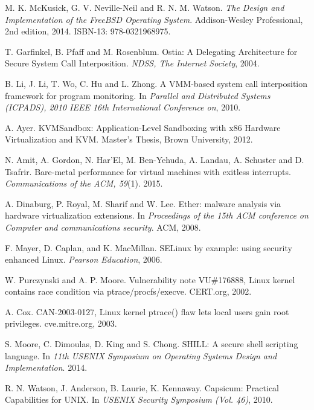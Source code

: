 \documentclass{article}
\begin{document}
\begin{thebibliography}{99}

M. K. McKusick, G. V. Neville-Neil and R. N. M. Watson.
\emph{The Design and Implementation of the FreeBSD Operating System}.
Addison-Wesley Professional,
2nd edition,
2014.
ISBN-13: 978-0321968975.

T. Garfinkel, B. Pfaff and M. Rosenblum.
Ostia: A Delegating Architecture for Secure System Call Interposition.
\emph{NDSS, The Internet Society}, 2004.

B. Li, J. Li, T. Wo, C. Hu and L. Zhong.
A VMM-based system call interposition framework for program monitoring.
In \emph{Parallel and Distributed Systems (ICPADS), 2010 IEEE 16th International Conference on}, 2010.

A. Ayer.
KVMSandbox: Application-Level Sandboxing with x86 Hardware Virtualization and KVM.
Master's Thesis, Brown University, 2012.

N. Amit, A. Gordon, N. Har'El, M. Ben-Yehuda, A. Landau, A. Schuster and D. Tsafrir.
Bare-metal performance for virtual machines with exitless interrupts.
\emph{Communications of the ACM, 59}(1). 2015.

A. Dinaburg, P. Royal, M. Sharif and W. Lee.
Ether: malware analysis via hardware virtualization extensions.
In \emph{Proceedings of the 15th ACM conference on Computer and communications security}.
ACM, 2008.

F. Mayer, D. Caplan, and K. MacMillan.
SELinux by example: using security enhanced Linux.
\emph{Pearson Education}, 2006.

W. Purczynski and A. P. Moore.
Vulnerability note VU\#176888, Linux kernel contains race condition via ptrace/procfs/execve.
CERT.org, 2002.

A. Cox.
CAN-2003-0127, Linux kernel ptrace() flaw lets local users gain root privileges.
cve.mitre.org, 2003.

S. Moore, C. Dimoulas, D. King and S. Chong.
SHILL: A secure shell scripting language.
In \emph{11th USENIX Symposium on Operating Systems Design and Implementation}. 2014.

R. N. Watson, J. Anderson, B. Laurie, K. Kennaway.
Capsicum: Practical Capabilities for UNIX.
In \emph{USENIX Security Symposium (Vol. 46)}, 2010.


\end{thebibliography}
\end{document}
